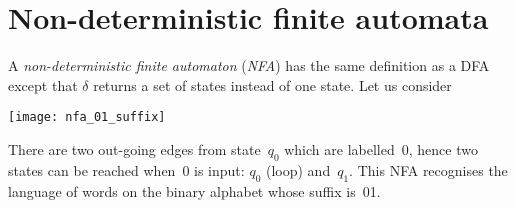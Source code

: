 \section{Non-deterministic finite automata}

A \emph{non-deterministic finite automaton} (\emph{NFA}) has the
same definition as a DFA except that \(\delta\) returns a set of
states instead of one state. Let us consider
\begin{center}
\texttt{[image: nfa\_01\_suffix]}
\label{nfa_01_suffix}
\end{center}
There are two out-going edges from state~\(q_0\) which are
labelled~\(0\), hence two states can be reached when~\(0\) is input:
\(q_0\) (loop) and~\(q_1\). This NFA recognises the language of words
on the binary alphabet whose suffix is~01.

